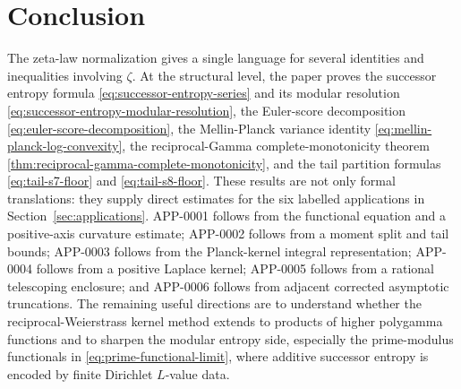 \documentclass[11pt]{article}
\numberwithin{equation}{section}
\theoremstyle{definition}
\theoremstyle{remark}
\newcommand{\1}{\mathbf 1}
\begin{document}
\section{Conclusion}

The zeta-law normalization gives a single language for several identities and inequalities involving \(\zeta\).  At the structural level, the paper proves the successor entropy formula \eqref{eq:successor-entropy-series} and its modular resolution \eqref{eq:successor-entropy-modular-resolution}, the Euler-score decomposition \eqref{eq:euler-score-decomposition}, the Mellin-Planck variance identity \eqref{eq:mellin-planck-log-convexity}, the reciprocal-Gamma complete-monotonicity theorem \eqref{thm:reciprocal-gamma-complete-monotonicity}, and the tail partition formulas \eqref{eq:tail-s7-floor} and \eqref{eq:tail-s8-floor}.  These results are not only formal translations: they supply direct estimates for the six labelled applications in Section~\ref{sec:applications}.  APP-0001 follows from the functional equation and a positive-axis curvature estimate; APP-0002 follows from a moment split and tail bounds; APP-0003 follows from the Planck-kernel integral representation; APP-0004 follows from a positive Laplace kernel; APP-0005 follows from a rational telescoping enclosure; and APP-0006 follows from adjacent corrected asymptotic truncations.  The remaining useful directions are to understand whether the reciprocal-Weierstrass kernel method extends to products of higher polygamma functions and to sharpen the modular entropy side, especially the prime-modulus functionals in \eqref{eq:prime-functional-limit}, where additive successor entropy is encoded by finite Dirichlet \(L\)-value data.
\end{document}
